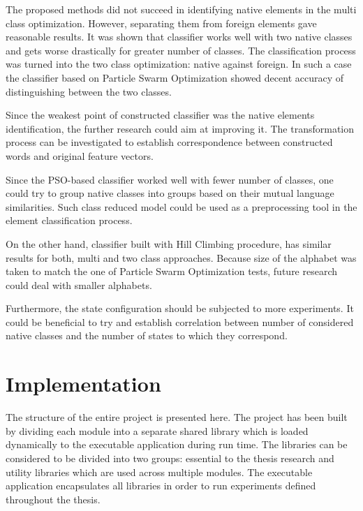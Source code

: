 \documentclass{mini}
\begin{document}
The proposed methods did not succeed in identifying native elements in the multi class optimization. However, separating them from foreign elements gave reasonable results. It was shown that classifier works well with two native classes and gets worse drastically for greater number of classes. The classification process was turned into the two class optimization: native against foreign. In such a case the classifier based on Particle Swarm Optimization showed decent accuracy of distinguishing between the two classes.

Since the weakest point of constructed classifier was the native elements identification, the further research could aim at improving it. The transformation process can be investigated to establish correspondence between constructed words and original feature vectors.

Since the PSO-based classifier worked well with fewer number of classes, one could try to group native classes into groups based on their mutual language similarities. Such class reduced model could be used as a preprocessing tool in the element classification process. 

On the other hand, classifier built with Hill Climbing procedure, has similar results for both, multi and two class approaches. Because size of the alphabet was taken to match the one of Particle Swarm Optimization tests, future research could deal with smaller alphabets.

Furthermore, the state configuration should be subjected to more experiments.
It could be beneficial to try and establish correlation between number of considered native classes and the number of states to which they correspond.


\appendix\label{appendix_a}

\chapter{Implementation} \label{chap:domain}
The structure of the entire project is presented here.
The project has been built by dividing each module into a separate shared library which is loaded dynamically to the executable application during run time. The libraries can be considered to be divided into two groups: essential to the thesis research and utility libraries which are used across multiple modules. The executable application encapsulates all libraries in order to run experiments defined throughout the thesis.
\end{document}
